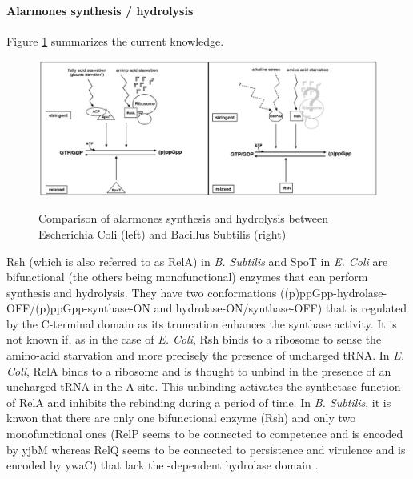 \paragraph{Alarmones synthesis / hydrolysis}
Figure \ref{tab:compareColiSubAlarmoneProd} summarizes the current knowledge.
\begin{figure}[hbtp]
  \centering
  \includegraphics[width=15cm]{figure/alarmoneProd.png}\\
  \caption{Comparison of alarmones synthesis and hydrolysis between Escherichia Coli (left) and Bacillus Subtilis (right) \citep{wolz_synthesis_2010}}\label{tab:compareColiSubAlarmoneProd}
\end{figure}
Rsh (which is also referred to as RelA) in {\it B. Subtilis} and SpoT in {\it E. Coli} are bifunctional (the others being monofunctional) enzymes that can perform synthesis and hydrolysis. They have two conformations ((p)ppGpp-hydrolase-OFF/(p)ppGpp-synthase-ON and hydrolase-ON/synthase-OFF) that is regulated by the C-terminal domain as its truncation enhances the synthase activity. It is not known if, as in the case of {\it E. Coli}, Rsh binds to a ribosome to sense the amino-acid starvation and more precisely the presence of uncharged tRNA. In {\it E. Coli}, RelA binds to a ribosome and is thought to unbind in the presence of an uncharged tRNA in the A-site. This unbinding activates the synthetase function of RelA and inhibits the rebinding during a period of time. In {\it B. Subtilis}, it is knwon that there are only one bifunctional enzyme (Rsh) and only two monofunctional ones (RelP seems to be connected to competence and is encoded by yjbM whereas RelQ seems to be connected to persistence and virulence and is encoded by ywaC) that lack the -dependent hydrolase domain \citep{GaL:15}.


